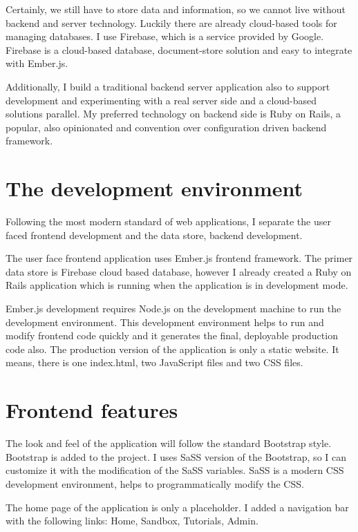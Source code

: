 \documentclass[11pt
              , a4paper
              , twoside
              , openright
              ]{report}
\begin{document}
Certainly, we still have to store data and information, so we cannot live without backend and server technology. Luckily there are already cloud-based tools for managing databases. I use Firebase, which is a service provided by Google. Firebase is a cloud-based database, document-store solution and easy to integrate with Ember.js.

Additionally, I build a traditional backend server application also to support development and experimenting with a real server side and a cloud-based solutions parallel. My preferred technology on backend side is Ruby on Rails, a popular, also opinionated and convention over configuration driven backend framework.


\section{The development environment}

Following the most modern standard of web applications, I separate the user faced frontend development and the data store, backend development.

The user face frontend application uses Ember.js frontend framework. The primer data store is Firebase cloud based database, however I already created a Ruby on Rails application which is running when the application is in development mode.

Ember.js development requires Node.js on the development machine to run the development environment. This development environment helps to run and modify frontend code quickly and it generates the final, deployable production code also. The production version of the application is only a static website. It means, there is one index.html, two JavaScript files and two CSS files.

\section{Frontend features}

The look and feel of the application will follow the standard Bootstrap style. Bootstrap is added to the project. I uses SaSS version of the Bootstrap, so I can customize it with the modification of the SaSS variables. SaSS is a modern CSS development environment, helps to programmatically modify the CSS.

The home page of the application is only a placeholder. I added a navigation bar with the following links: Home, Sandbox, Tutorials, Admin.
\end{document}
